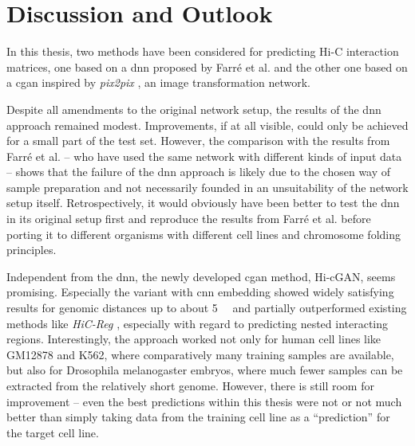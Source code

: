 \section{Discussion and Outlook}
In this thesis, two methods have been considered for predicting Hi-C interaction matrices,
one based on a \acrlong{dnn} proposed by Farr\'e et al. \cite{Farre2018a} and the other one based on a \acrlong{cgan}
inspired by \emph{pix2pix} \cite{Isola2017}, an image transformation network.

Despite all amendments to the original network setup,
the results of the \acrlong{dnn} approach remained modest.
Improvements, if at all visible, could only be achieved for a small part of the test set.
However, the comparison with the results from Farr\'e et al. \cite{Farre2018a} -- who have used the same network with different kinds of input data --
shows that the failure of the \acrshort{dnn} approach is likely due to the chosen way of sample preparation 
and not necessarily founded in an unsuitability of the network setup itself.
Retrospectively, it would obviously have been better to test the \acrshort{dnn} in its original setup first and reproduce the results from Farr\'e et al. \cite{Farre2018a} 
before porting it to different organisms with different cell lines and chromosome folding principles.

Independent from the \acrshort{dnn}, the newly developed \acrlong{cgan} method, Hi-cGAN, seems promising.
Especially the variant with \acrshort{cnn} embedding showed widely satisfying results for genomic distances up to about \SI{5}{\mega\bp}
and partially outperformed existing methods like \emph{HiC-Reg} \cite{Zhang2019}, especially with regard to predicting nested interacting regions.
Interestingly, the approach worked not only for human cell lines like GM12878 and K562, where comparatively many training samples are available,
but also for Drosophila melanogaster embryos, where much fewer samples can be extracted from the relatively short genome.
However, there is still room for improvement -- even the best predictions within this thesis were not or not much better 
than simply taking data from the training cell line as a ``prediction'' for the target cell line.


